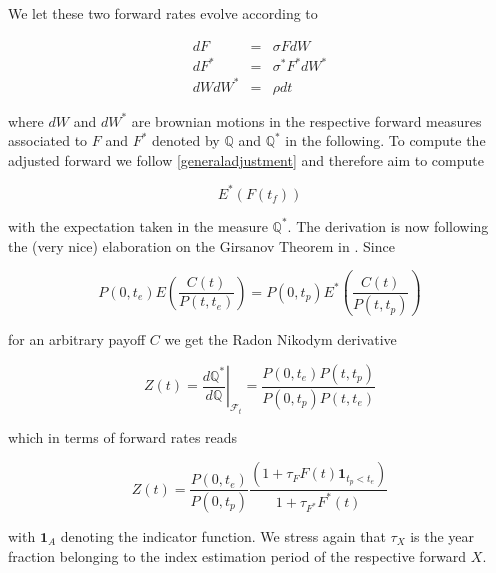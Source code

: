 \documentclass{amsart}
\theoremstyle{plain}
\numberwithin{equation}{section}
\begin{document}
We let these two forward rates evolve according to 

\begin{eqnarray}\label{model}
dF &=& \sigma F dW \\
dF^* &=& \sigma^* F^* dW^* \\
dW dW^* &=& \rho dt
\end{eqnarray}

where $dW$ and $dW^*$ are brownian motions in the respective forward measures associated to $F$ and $F^*$ denoted by $\mathbb{Q}$ and $\mathbb{Q}^*$
in the following. To compute the adjusted forward we follow \ref{generaladjustment} and therefore aim to compute

\begin{equation}
E^*( F(t_f) )
\end{equation}

with the expectation taken in the measure $\mathbb{Q}^*$. The derivation is now following the (very nice) elaboration on the Girsanov Theorem in \cite{Papa}.
Since

\begin{equation}
P(0,t_e) E\left( \frac{C(t)}{P(t,t_e)} \right) = P(0,t_p) E^*\left( \frac{C(t)}{P(t,t_p)} \right)
\end{equation}

for an arbitrary payoff $C$ we get the Radon Nikodym derivative

\begin{equation}
Z(t) = \left. \frac{d\mathbb{Q}^*}{d\mathbb{Q}} \right|_{\mathcal{F}_t} = \frac{P(0,t_e)P(t,t_p)}{ P(0,t_p)P(t,t_e)}
\end{equation}

which in terms of forward rates reads

\begin{equation}
Z(t) = \frac{P(0,t_e)}{P(0,t_p)} \frac{(1+\tau_F F(t)\textbf{1}_{t_p < t_e})}{1+\tau_{F^*} F^*(t)}
\end{equation}

with $\textbf{1}_A$ denoting the indicator function. We stress again that $\tau_X$ is the year fraction belonging to the index estimation period
of the respective forward $X$.

%
\end{document}
